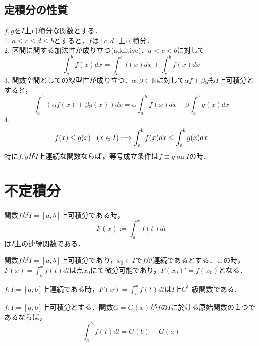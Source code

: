 \documentclass[uplatex, dvipdfmx]{jsreport}
\begin{document}
\subsection{定積分の性質}

\begin{shadebox}
    \begin{proposition}[定積分の性質]
        $f,g$を$I$上可積分な関数とする．\\
        1. $a\le c\le d\le b$とすると，$f$は$[c,d]$上可積分．\\
        2. 区間に関する加法性が成り立つ(additive)．$a<c<b$に対して$$\int^b_af(x)dx = \int^c_af(x)dx + \int^b_cf(x)dx$$
        3. 関数空間としての線型性が成り立つ．$\alpha,\beta\in\mathbb{R}$に対して$\alpha f + \beta g$も$I$上可積分とすると，$$\int^b_a(\alpha f(x)+\beta g(x))dx = \alpha\int^b_a f(x)dx + \beta\int^b_a g(x)dx$$
        4. $$f(x)\le g(x) \hspace{3mm} (x\in I) \Longrightarrow \int^b_af(x)dx \le \int^b_a g(x)dx$$
        \hspace{1zw}特に$f,g$が$I$上連続な関数ならば，等号成立条件は$f\equiv g \; \mathrm{on} \; I$の時．
    \end{proposition}
\end{shadebox}

\section{不定積分}

\begin{shadebox}
    \begin{proposition}
        関数$f$が$I=[a,b]$上可積分である時，$$F(x):=\int^x_af(t)dt$$は$I$上の連続関数である．
    \end{proposition}
    \begin{proposition}
        関数$f$が$I=[a,b]$上可積分であり，$x_0\in I$で$f$が連続であるとする．この時，$F(x)=\int^x_af(t)dt$は点$x_0$にて微分可能であり，$F(x_0)'=f(x_0)$となる．
    \end{proposition}
    \begin{corollary}
        $f:I=[a,b]$上連続である時，$F(x)=\int^x_af(t)dt$は$I$上$C^1$-級関数である．
    \end{corollary}
    \begin{theorem}[微分積分学の基本定理]
        $f:I=[a,b]$上可積分とする．関数$G=G(x)$が$f$の$I$に於ける原始関数の１つであるならば，$$\int^b_af(t)dt=G(b)-G(a)$$
    \end{theorem}
\end{shadebox}
\end{document}
